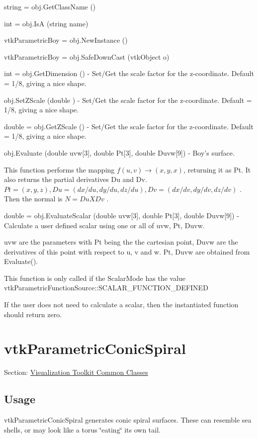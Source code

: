 \begin{DoxyItemize}
\item {\ttfamily string = obj.\-Get\-Class\-Name ()}  
\item {\ttfamily int = obj.\-Is\-A (string name)}  
\item {\ttfamily vtk\-Parametric\-Boy = obj.\-New\-Instance ()}  
\item {\ttfamily vtk\-Parametric\-Boy = obj.\-Safe\-Down\-Cast (vtk\-Object o)}  
\item {\ttfamily int = obj.\-Get\-Dimension ()} -\/ Set/\-Get the scale factor for the z-\/coordinate. Default = 1/8, giving a nice shape.  
\item {\ttfamily obj.\-Set\-Z\-Scale (double )} -\/ Set/\-Get the scale factor for the z-\/coordinate. Default = 1/8, giving a nice shape.  
\item {\ttfamily double = obj.\-Get\-Z\-Scale ()} -\/ Set/\-Get the scale factor for the z-\/coordinate. Default = 1/8, giving a nice shape.  
\item {\ttfamily obj.\-Evaluate (double uvw\mbox{[}3\mbox{]}, double Pt\mbox{[}3\mbox{]}, double Duvw\mbox{[}9\mbox{]})} -\/ Boy's surface.

This function performs the mapping $f(u,v) \rightarrow (x,y,x)$, returning it as Pt. It also returns the partial derivatives Du and Dv. $Pt = (x, y, z), Du = (dx/du, dy/du, dz/du), Dv = (dx/dv, dy/dv, dz/dv)$ . Then the normal is $N = Du X Dv$ .  
\item {\ttfamily double = obj.\-Evaluate\-Scalar (double uvw\mbox{[}3\mbox{]}, double Pt\mbox{[}3\mbox{]}, double Duvw\mbox{[}9\mbox{]})} -\/ Calculate a user defined scalar using one or all of uvw, Pt, Duvw.

uvw are the parameters with Pt being the the cartesian point, Duvw are the derivatives of this point with respect to u, v and w. Pt, Duvw are obtained from Evaluate().

This function is only called if the Scalar\-Mode has the value vtk\-Parametric\-Function\-Source\-::\-S\-C\-A\-L\-A\-R\-\_\-\-F\-U\-N\-C\-T\-I\-O\-N\-\_\-\-D\-E\-F\-I\-N\-E\-D

If the user does not need to calculate a scalar, then the instantiated function should return zero.


\end{DoxyItemize}\hypertarget{vtkcommon_vtkparametricconicspiral}{}\section{vtk\-Parametric\-Conic\-Spiral}\label{vtkcommon_vtkparametricconicspiral}
Section\-: \hyperlink{sec_vtkcommon}{Visualization Toolkit Common Classes} \hypertarget{vtkwidgets_vtkxyplotwidget_Usage}{}\subsection{Usage}\label{vtkwidgets_vtkxyplotwidget_Usage}
vtk\-Parametric\-Conic\-Spiral generates conic spiral surfaces. These can resemble sea shells, or may look like a torus \char`\"{}eating\char`\"{} its own tail.


